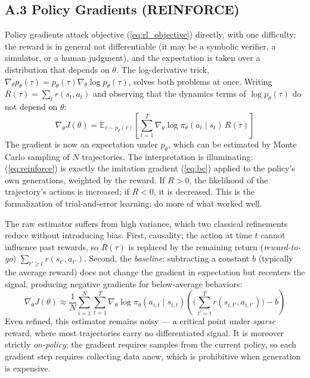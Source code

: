 \documentclass[11pt,a4paper]{article}
\begin{document}
\subsection*{A.3 Policy Gradients (REINFORCE)}
Policy gradients attack objective (\ref{eq:rl_objective}) directly, with one difficulty: the reward is in general not differentiable (it may be a symbolic verifier, a simulator, or a human judgment), and the expectation is taken over a distribution that depends on $\theta$. The log-derivative trick, $\nabla_\theta p_\theta(\tau) = p_\theta(\tau) \nabla_\theta \log p_\theta(\tau)$, solves both problems at once. Writing $R(\tau) = \sum_t r(s_t, a_t)$ and observing that the dynamics terms of $\log p_\theta(\tau)$ do not depend on $\theta$:
\begin{equation}
\nabla_\theta J(\theta) = \mathbb{E}_{\tau \sim p_\theta(\tau)} \left[ \sum_{t=1}^{T} \nabla_\theta \log \pi_\theta(a_t \mid s_t) \, R(\tau) \right]
\label{eq:reinforce}
\end{equation}
The gradient is now an expectation under $p_\theta$, which can be estimated by Monte Carlo sampling of $N$ trajectories. The interpretation is illuminating: (\ref{eq:reinforce}) is exactly the imitation gradient (\ref{eq:bc}) applied to the policy's own generations, weighted by the reward. If $R > 0$, the likelihood of the trajectory's actions is increased; if $R < 0$, it is decreased. This is the formalization of trial-and-error learning: do more of what worked well.

The raw estimator suffers from high variance, which two classical refinements reduce without introducing bias. First, causality: the action at time $t$ cannot influence past rewards, so $R(\tau)$ is replaced by the remaining return (\emph{reward-to-go}) $\sum_{t' \geq t} r(s_{t'}, a_{t'})$. Second, the \emph{baseline}: subtracting a constant $b$ (typically the average reward) does not change the gradient in expectation but recenters the signal, producing negative gradients for below-average behaviors:
\begin{equation}
\nabla_\theta J(\theta) \approx \frac{1}{N} \sum_{i=1}^{N} \sum_{t=1}^{T} \nabla_\theta \log \pi_\theta(a_{i,t} \mid s_{i,t}) \left( \Big( \sum_{t' = t}^{T} r(s_{i,t'}, a_{i,t'}) \Big) - b \right)
\label{eq:pg_baseline}
\end{equation}
Even refined, this estimator remains noisy — a critical point under \emph{sparse} reward, where most trajectories carry no differentiated signal. It is moreover strictly \emph{on-policy}: the gradient requires samples from the current policy, so each gradient step requires collecting data anew, which is prohibitive when generation is expensive.
\end{document}
